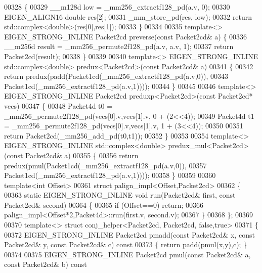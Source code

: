 \begin{DoxyCode}
00328 \{
00329   \_\_m128d low = \_mm256\_extractf128\_pd(a.v, 0);
00330   EIGEN\_ALIGN16 \textcolor{keywordtype}{double} res[2];
00331   \_mm\_store\_pd(res, low);
00332   \textcolor{keywordflow}{return} std::complex<double>(res[0],res[1]);
00333 \}
00334 
00335 \textcolor{keyword}{template}<> EIGEN\_STRONG\_INLINE Packet2cd preverse(\textcolor{keyword}{const} Packet2cd& a) \{
00336   \_\_m256d result = \_mm256\_permute2f128\_pd(a.v, a.v, 1);
00337   \textcolor{keywordflow}{return} Packet2cd(result);
00338 \}
00339 
00340 \textcolor{keyword}{template}<> EIGEN\_STRONG\_INLINE std::complex<double> predux<Packet2cd>(\textcolor{keyword}{const} Packet2cd& a)
00341 \{
00342   \textcolor{keywordflow}{return} predux(padd(Packet1cd(\_mm256\_extractf128\_pd(a.v,0)),
00343                      Packet1cd(\_mm256\_extractf128\_pd(a.v,1))));
00344 \}
00345 
00346 \textcolor{keyword}{template}<> EIGEN\_STRONG\_INLINE Packet2cd preduxp<Packet2cd>(\textcolor{keyword}{const} Packet2cd* vecs)
00347 \{
00348   Packet4d t0 = \_mm256\_permute2f128\_pd(vecs[0].v,vecs[1].v, 0 + (2<<4));
00349   Packet4d t1 = \_mm256\_permute2f128\_pd(vecs[0].v,vecs[1].v, 1 + (3<<4));
00350 
00351   \textcolor{keywordflow}{return} Packet2cd(\_mm256\_add\_pd(t0,t1));
00352 \}
00353 
00354 \textcolor{keyword}{template}<> EIGEN\_STRONG\_INLINE std::complex<double> predux\_mul<Packet2cd>(\textcolor{keyword}{const} Packet2cd& a)
00355 \{
00356   \textcolor{keywordflow}{return} predux(pmul(Packet1cd(\_mm256\_extractf128\_pd(a.v,0)),
00357                      Packet1cd(\_mm256\_extractf128\_pd(a.v,1))));
00358 \}
00359 
00360 \textcolor{keyword}{template}<\textcolor{keywordtype}{int} Offset>
00361 \textcolor{keyword}{struct }palign\_impl<Offset,Packet2cd>
00362 \{
00363   \textcolor{keyword}{static} EIGEN\_STRONG\_INLINE \textcolor{keywordtype}{void} run(Packet2cd& first, \textcolor{keyword}{const} Packet2cd& second)
00364   \{
00365     \textcolor{keywordflow}{if} (Offset==0) \textcolor{keywordflow}{return};
00366     palign\_impl<Offset*2,Packet4d>::run(first.v, second.v);
00367   \}
00368 \};
00369 
00370 \textcolor{keyword}{template}<> \textcolor{keyword}{struct }conj\_helper<Packet2cd, Packet2cd, false,true>
00371 \{
00372   EIGEN\_STRONG\_INLINE Packet2cd pmadd(\textcolor{keyword}{const} Packet2cd& x, \textcolor{keyword}{const} Packet2cd& y, \textcolor{keyword}{const} Packet2cd& c)\textcolor{keyword}{ const}
00373 \textcolor{keyword}{  }\{ \textcolor{keywordflow}{return} padd(pmul(x,y),c); \}
00374 
00375   EIGEN\_STRONG\_INLINE Packet2cd pmul(\textcolor{keyword}{const} Packet2cd& a, \textcolor{keyword}{const} Packet2cd& b)\textcolor{keyword}{ const}

\end{DoxyCode}
